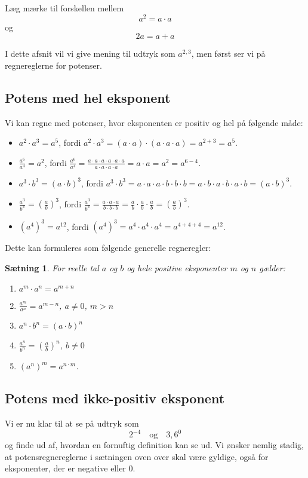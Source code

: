 \documentclass[12pt,oneside,a4paper]{article}
\theoremstyle{plain}
\newtheorem*{thm}{Sætning}
\begin{document}
Læg mærke til forskellen mellem
$$
a^2 = a \cdot a
$$
og
$$
2a = a + a
$$

I dette afsnit vil vi give mening til udtryk som $a^{2,3}$, men først ser vi
på regnereglerne for potenser.

\subsection*{Potens med hel eksponent}
Vi kan regne med potenser, hvor eksponenten er positiv og hel på følgende måde:
\begin{itemize}
    \item $a^2 \cdot a^3 = a^5$, fordi $a^2\cdot a^3 = (a\cdot a)\cdot (a \cdot
        a\cdot a) = a^{2+3} = a^5$.
    \item $\frac{a^6}{a^4} = a^2$, fordi $\frac{a^6}{a^4} = \frac{a \cdot a
        \cdot a\cdot a\cdot a\cdot a}{a\cdot a\cdot a\cdot a} = a\cdot a = a^2
        = a^{6-4}$.
    \item $a^3\cdot b^3 = (a\cdot b)^3$, fordi $a^3 \cdot b^3 = a\cdot a\cdot
        a\cdot b\cdot b\cdot b = a\cdot b\cdot a\cdot b\cdot a\cdot b = (a\cdot
        b)^3$.
    \item $\frac{a^3}{b^3} = \left(\frac{a}{b}\right)^3$, fordi
        $\frac{a^3}{b^3} = \frac{a\cdot a\cdot a}{b\cdot b\cdot b} =
        \frac{a}{b} \cdot \frac{a}{b} \cdot \frac{a}{b} =
        \left(\frac{a}{b}\right)^3$.
    \item $(a^4)^3 = a^{12}$, fordi $(a^4)^3 = a^4\cdot a^4 \cdot a^4 =
        a^{4+4+4} = a^{12}$.
\end{itemize}
Dette kan formuleres som følgende generelle regneregler:
\begin{thm}
    For reelle tal $a$ og $b$ og hele positive eksponenter $m$ og $n$ gælder:
    
    \begin{enumerate}
        \item $a^m \cdot a^n = a^{m+n}$
        \item $\frac{a^m}{a^n} = a^{m-n}$, \quad $a\neq 0$, \quad $m>n$
        \item $a^n\cdot b^n = (a\cdot b)^n$
        \item $\frac{a^n}{b^n} = \left(\frac{a}{b}\right)^n$, \quad $b\neq 0$
        \item $(a^n)^m = a^{n\cdot m}$.
    \end{enumerate}
\end{thm}

\subsection*{Potens med ikke-positiv eksponent}
Vi er nu klar til at se på udtryk som 
$$
2^{-4}\quad \mbox{og} \quad 3,6^0
$$
og finde ud af, hvordan en fornuftig definition kan se ud. Vi ønsker nemlig
stadig, at potensregnereglerne i sætningen oven over skal være gyldige, også
for eksponenter, der er negative eller 0.
\end{document}
